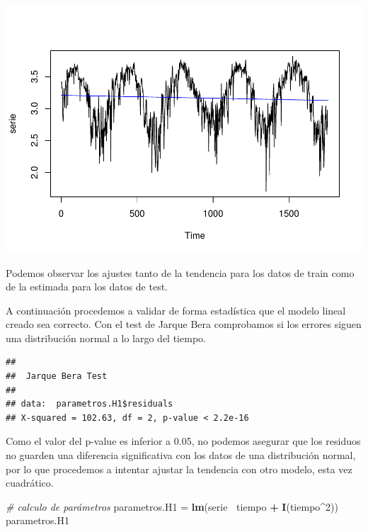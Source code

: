 \documentclass[]{article}
\newenvironment{Shaded}{\begin{snugshade}}{\end{snugshade}}
\newcommand{\KeywordTok}[1]{\textcolor[rgb]{0.13,0.29,0.53}{\textbf{#1}}}
\newcommand{\DecValTok}[1]{\textcolor[rgb]{0.00,0.00,0.81}{#1}}
\newcommand{\StringTok}[1]{\textcolor[rgb]{0.31,0.60,0.02}{#1}}
\newcommand{\CommentTok}[1]{\textcolor[rgb]{0.56,0.35,0.01}{\textit{#1}}}
\newcommand{\OperatorTok}[1]{\textcolor[rgb]{0.81,0.36,0.00}{\textbf{#1}}}
\newcommand{\NormalTok}[1]{#1}
\begin{document}
\includegraphics{timeSeries_files/figure-latex/unnamed-chunk-47-1.pdf}

Podemos observar los ajustes tanto de la tendencia para los datos de
train como de la estimada para los datos de test.

A continuación procedemos a validar de forma estadística que el modelo
lineal creado sea correcto. Con el test de Jarque Bera comprobamos si
los errores siguen una distribución normal a lo largo del tiempo.

\begin{Shaded}
\end{Shaded}

\begin{verbatim}
## 
##  Jarque Bera Test
## 
## data:  parametros.H1$residuals
## X-squared = 102.63, df = 2, p-value < 2.2e-16
\end{verbatim}

Como el valor del p-value es inferior a 0.05, no podemos asegurar que
los residuos no guarden una diferencia significativa con los datos de
una distribución normal, por lo que procedemos a intentar ajustar la
tendencia con otro modelo, esta vez cuadrático.

\begin{Shaded}
\begin{Highlighting}[]
\CommentTok{# calculo de parámetros}
\NormalTok{parametros.H1 =}\StringTok{ }\KeywordTok{lm}\NormalTok{(serie }\OperatorTok{~}\NormalTok{tiempo }\OperatorTok{+}\StringTok{ }\KeywordTok{I}\NormalTok{(tiempo}\OperatorTok{^}\DecValTok{2}\NormalTok{)) }
\NormalTok{parametros.H1}
\end{Highlighting}
\end{Shaded}
\end{document}
